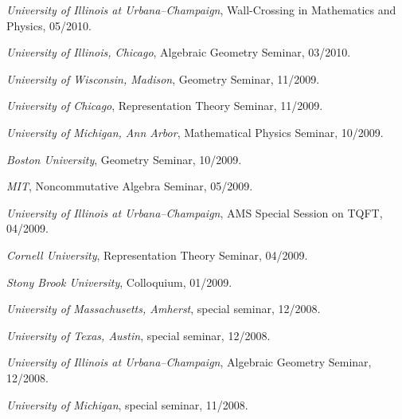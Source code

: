 \documentclass[11pt]{article}
\begin{document}
\begin{cvlist}
  \item \emph{University of Illinois at Urbana--Champaign}, Wall-Crossing in
    Mathematics and Physics, 05/2010.
  \item \emph{University of Illinois, Chicago}, Algebraic Geometry Seminar,
    03/2010.
\end{cvlist}

\begin{cvlist}
  \item \emph{University of Wisconsin, Madison}, Geometry Seminar, 11/2009.
  \item \emph{University of Chicago}, Representation Theory Seminar,
    11/2009.
  \item \emph{University of Michigan, Ann Arbor}, Mathematical Physics
    Seminar, 10/2009.
  \item \emph{Boston University}, Geometry Seminar, 10/2009.
  \item \emph{MIT}, Noncommutative Algebra Seminar, 05/2009.
  \item \emph{University of Illinois at Urbana--Champaign}, AMS Special
    Session on TQFT, 04/2009.
  \item \emph{Cornell University}, Representation Theory Seminar, 04/2009.
  \item \emph{Stony Brook University}, Colloquium, 01/2009.
\end{cvlist}

\begin{cvlist}
  \item \emph{University of Massachusetts, Amherst}, special seminar,
    12/2008.
  \item \emph{University of Texas, Austin}, special seminar, 12/2008.
  \item \emph{University of Illinois at Urbana--Champaign}, Algebraic
    Geometry Seminar, 12/2008.
  \item \emph{University of Michigan}, special seminar, 11/2008.
\end{cvlist}
\end{document}
